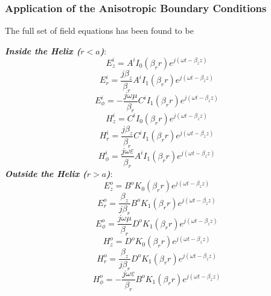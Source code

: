 \subsubsection{Application of the Anisotropic Boundary Conditions}\label{subsubsec:asymptotic}
The full set of field equations has been found to be

\hspace*{2em} \textit{\textbf{Inside the Helix ($r<a$)}}:
\begin{equation}\label{eq:Ez_ins}
	E_{z}^{i} = A^{i}I_{0}(\beta_{r}r)e^{j(\omega t - \beta_{z}z)}
\end{equation}
\begin{equation}\label{eq:Er_ins}
	E_r^i = \frac{j \beta_z}{\beta_r} A^i I_1(\beta_r r) e^{j(\omega t - \beta_z z)}
\end{equation}
\begin{equation}\label{eq:Ephi_ins}
	E_\phi^i = -\frac{j \omega \mu}{\beta_r} C^i I_1(\beta_r r) e^{j(\omega t - \beta_z z)}
\end{equation}
\begin{equation}\label{eq:Hz_ins}
	H_{z}^{i} = C^{i}I_{0}(\beta_{r}r)e^{j(\omega t - \beta_{z}z)}
\end{equation}
\begin{equation}\label{eq:Hr_ins}
	H_r^i = \frac{j \beta_z}{\beta_r} C^i I_1(\beta_r r) e^{j(\omega t - \beta_z z)}
\end{equation}
\begin{equation}\label{eq:Hphi_ins}
	H_\phi^i = \frac{j \omega \varepsilon}{\beta_r} A^i I_1(\beta_r r) e^{j(\omega t - \beta_z z)}
\end{equation}
\hspace*{2em} \textit{\textbf{Outside the Helix ($r>a$)}}:
\begin{equation}\label{eq:Ez_out}
	E_{z}^{o} = B^{o}K_{0}(\beta_{r}r)e^{j(\omega t - \beta_{z}z)}
\end{equation}
\begin{equation}\label{eq:Er_out}
	E_r^o = \frac{\beta_z}{j \beta_r} B^o K_1(\beta_r r) e^{j(\omega t - \beta_z z)}
\end{equation}
\begin{equation}\label{eq:Ephi_out}
	E_\phi^o = \frac{j \omega \mu}{\beta_r} D^o K_1(\beta_r r) e^{j(\omega t - \beta_z z)}
\end{equation}
\begin{equation}\label{eq:Hz_out}
	H_{z}^{o} = D^{o}K_{0}(\beta_{r}r)e^{j(\omega t - \beta_{z}z)}
\end{equation}
\begin{equation}\label{eq:Hr_out}
	H_r^o = \frac{\beta_z}{j \beta_r} D^o K_1(\beta_r r) e^{j(\omega t - \beta_z z)}
\end{equation}
\begin{equation}\label{eq:Hphi_out}
	H_\phi^o = -\frac{j \omega \varepsilon}{\beta_r} B^o K_1(\beta_r r) e^{j(\omega t - \beta_z z)}
\end{equation}


